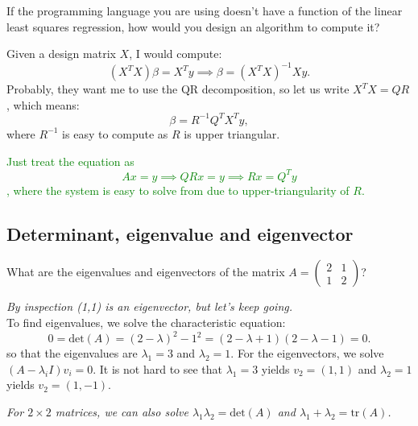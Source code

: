 \begin{qanda}
  \Q
  If the programming language you are using doesn't have a function of the linear least squares regression, how would you design an algorithm to compute it?


  \A
  Given a design matrix $X$, I would compute: 
  \[
      (X^T X)\beta = X^T y \implies \beta = (X^T X)^{-1}  X y.
  \]
  Probably, they want me to use the QR decomposition, so let us write $X^T X = QR$, which means:
  \[
  \beta = R^{-1} Q^T X^T y,
  \]
  where $R^{-1}$ is easy to compute as $R$ is upper triangular. 

  \textcolor{green}{Just treat the equation as
      \[
      Ax = y \implies QRx = y \implies Rx=Q^Ty
      \],
      where the system is easy to solve from  due to upper-triangularity of $R$.}

\end{qanda}

\subsection{Determinant, eigenvalue and eigenvector}

\begin{qanda} %
    \Q What are the eigenvalues and eigenvectors of the matrix $A = \begin{pmatrix}
        2 & 1 \\
        1 & 2
    \end{pmatrix}$?

    \A \emph{By inspection (1,1) is an eigenvector, but let's keep going.}\\
    To find eigenvalues, we solve the characteristic equation:
    \[
    0 = \text{det}(A) = (2-\lambda)^2 - 1^2 =  (2-\lambda + 1)(2-\lambda - 1) = 0.
    \]
    so that the eigenvalues are $\lambda_1 = 3$ and $\lambda_2 = 1$.
    For the eigenvectors, we solve $(A - \lambda_i I) v_i = 0$.
    It is not hard to see that
    $\lambda_1=3$ yields $v_2 = (1, 1)$ and
    $\lambda_2=1$ yields $v_2 = (1, -1)$.

    \emph{For $2\times 2$ matrices, we can also solve $\lambda_1 \lambda_2 = \text{det}(A)$ and $\lambda_1 + \lambda_2 = \text{tr}(A)$.}
\end{qanda}
